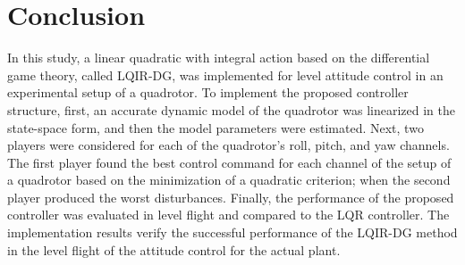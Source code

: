 \documentclass[conference]{IEEEtran}
\begin{document}
\section{Conclusion}\label{sec:conclusion}
\noindent In this study, a linear quadratic with integral action based on the differential game theory, called LQIR-DG, was implemented for level attitude control in an experimental setup of a quadrotor. To implement the proposed controller structure, first, an accurate dynamic model of the quadrotor was linearized in the state-space form, and then the model parameters were estimated. Next, two players were considered for each of the quadrotor's roll, pitch, and yaw channels. The first player found the best control command for each channel of the setup of a quadrotor based on the minimization of a quadratic criterion; when the second player produced the worst disturbances. Finally, the performance of the proposed controller was evaluated in level flight and compared to the LQR controller. The implementation results verify the successful performance of the LQIR-DG method in the level flight of the attitude control for the actual plant.










\end{document}
